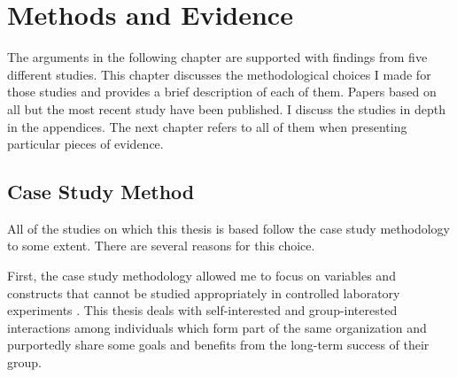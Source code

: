 \chapter{Methods and Evidence}
\label{chap:Methods}

The arguments in the following chapter are supported with findings from five different studies. This chapter discusses the methodological choices I made for those studies and provides a brief description of each of them. Papers based on all but the most recent study have been published. I discuss the studies in depth in the appendices. The next chapter refers to all of them when presenting particular pieces of evidence.


\section{Case Study Method}

All of the studies on which this thesis is based follow the case study methodology \cite{Yin2003} to some extent. There are several reasons for this choice.

First, the case study methodology allowed me to focus on variables and constructs that cannot be studied appropriately in controlled laboratory experiments \cite{Easterbrook2007}. This thesis deals with self-interested and group-interested interactions among individuals which form part of the same organization and purportedly share some goals and benefits from the long-term success of their group.

